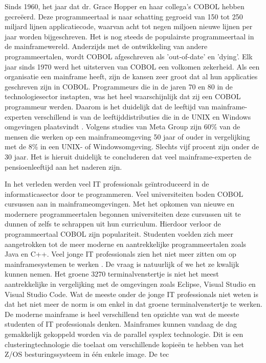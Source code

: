 Sinds 1960, het jaar dat dr. Grace Hopper en haar collega's COBOL hebben gecreëerd. Deze programmeertaal is naar schatting gegroeid van 150 tot 250 miljard lijnen applicatiecode, waarvan acht tot negen miljoen nieuwe lijnen per jaar worden bijgeschreven. Het is nog steeds de populairste programmeertaal in de mainframewereld. Anderzijds met de ontwikkeling van andere programmeertalen, wordt COBOL afgeschreven als 'out-of-date' en 'dying'. Elk jaar sinds 1970 werd het uitsterven van COBOL een volkomen zekerheid. Als een organisatie een mainframe heeft, zijn de kansen zeer groot dat al hun applicaties geschreven zijn in COBOL. Programmeurs die in de jaren 70 en 80 in de technologiesector instapten, was het heel waarschijnlijk dat zij een COBOL programmeur werden. Daarom is het duidelijk dat de leeftijd van mainframe-experten verschillend is van de leeftijddistributies die in de UNIX en Windows omgevingen plaatsvindt \autocite{McGirr}. Volgens studies van Meta Group zijn 60\% van de mensen die werken op een mainframeomgeving  50 jaar of ouder in vergelijking met de 8\% in een UNIX- of Windowsomgeving. Slechts vijf procent zijn onder de 30 jaar. Het is hieruit duidelijk te concluderen dat veel mainframe-experten de pensioenleeftijd aan het naderen zijn. 

In het verleden werden veel IT professionals geïntroduceerd in de informaticasector door te programmeren. Veel universiteiten boden COBOL cursussen aan in mainframeomgevingen. Met het opkomen van nieuwe en modernere programmeertalen begonnen universiteiten deze cursussen uit te dunnen of zelfs te schrappen uit hun curriculum. Hierdoor verloor de programmeertaal COBOL zijn populariteit. Studenten voelden zich meer aangetrokken tot de meer moderne en aantrekkelijke programmeertalen zoals Java en C++. Veel jonge IT professionals zien het niet meer zitten om op mainframesystemen te werken \autocite{Mullins2016}. De vraag is natuurlijk of we het ze kwalijk kunnen nemen. Het groene 3270 terminalvenstertje is niet het meest aantrekkelijke in vergelijking met de omgevingen zoals Eclipse, Visual Studio en Visual Studio Code. Wat de meeste onder de jonge IT professionals niet weten is dat het niet meer de norm is om enkel in dat groene terminalvenstertje te werken. De moderne mainframe is heel verschillend ten opzichte van wat de meeste studenten of IT professionals denken. Mainframes kunnen vandaag de dag gemakkelijk gekoppeld worden via de parallel sysplex technologie. Dit is een clusteringtechnologie die toelaat om verschillende kopieën te hebben van het Z/OS besturingssysteem in één enkele image. De tec


